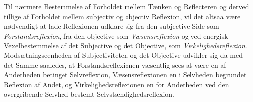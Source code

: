 \documentclass[11pt]{book}
\newcommand{\opage}[1]{\marginnote{\footnotesize\textit{[#1]}}}
\begin{document}
Til nærmere Bestemmelse af Forholdet mellem Tænken og Reflecteren og derved
tillige af Forholdet mellem subjectiv og objectiv Reflexion, vil det altsaa
være nødvendigt at lade Reflexionen udklare sig fra den subjective Side som
\emph{Forstandsreflexion}, fra den objective som \emph{Væsensreflexion} og
ved energisk Vexelbestemmelse af det Subjective og det
\opage{60} \setcounter{footnote}{0}%
Objective, som \emph{Virkelighedsreflexion}. Modsætningseenheden af
Subjectiviteten og det Objective udvikler sig da med det Samme saaledes, at
Forstandsreflexionen væsentlig sees at være en af Andetheden betinget
Selvreflexion, Væsensreflexionen en i Selvheden begrundet Reflexion af
Andet, og Virkelighedsreflexionen en for Andetheden ved den overgribende
Selvhed bestemt Selvstændighedsreflexion.

\end{document}

